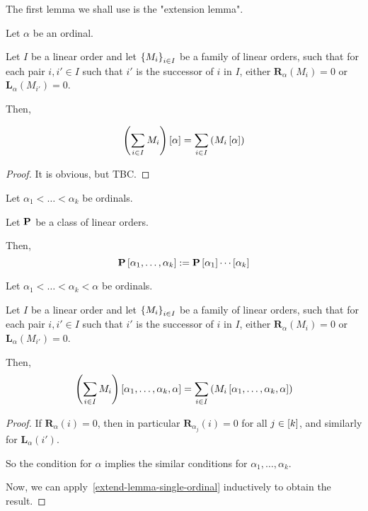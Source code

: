 The first lemma we shall use is the "extension lemma".

\begin{lemma}\label{extend-lemma-single-ordinal}
  Let $\alpha$ be an ordinal.

  Let $I$ be a linear order
  and let $\left\{ {M_i} \right\}_{i \in I}$ be a family of linear orders,
  such that for each pair $i, i' \in I$
  such that $i'$ is the successor of $i$ in $I$,
  either $\mathbf{R}_\alpha(M_{i}) = 0$ or $\mathbf{L}_\alpha(M_{i'}) = 0$.

  Then,

  \[
    \left( { \sum_{i \in I} M_i } \right) \left[ {\alpha} \right] = \sum_{i \in I} \left( { M_i \left[ {\alpha} \right] } \right)
  \]
\end{lemma}

\begin{proof}
  It is obvious, but TBC.
\end{proof}

\begin{notation}
  Let $\alpha_1 < \ldots < \alpha_k$ be ordinals.

  Let $\mathbf{P}$ be a class of linear orders.

  Then,
  \[
    \mathbf{P} \left[ {\alpha_1, \ldots, \alpha_k} \right] := \mathbf{P} \left[ {\alpha_1} \right] \cdots \left[ {\alpha_k} \right]
  \]
\end{notation}

\begin{corollary}\label{extend-lemma-multiple-ordinals}
  Let $\alpha_1 < \ldots < \alpha_k < \alpha$ be ordinals.

  Let $I$ be a linear order
  and let $\left\{ {M_i} \right\}_{i \in I}$ be a family of linear orders,
  such that for each pair $i, i' \in I$
  such that $i'$ is the successor of $i$ in $I$,
  either $\mathbf{R}_\alpha(M_{i}) = 0$ or $\mathbf{L}_\alpha(M_{i'}) = 0$.

  Then,
  \[
    \left( { \sum_{i \in I} M_i } \right) \left[ {\alpha_1, \ldots, \alpha_k, \alpha} \right]
    = \sum_{i \in I} \left( { M_i \left[ {\alpha_1, \ldots, \alpha_k, \alpha} \right] } \right)
  \]
\end{corollary}

\begin{proof}
  If $\mathbf{R}_\alpha(i) = 0$, then in particular
  $\mathbf{R}_{\alpha_j}(i) = 0$ for all $j \in \left[ {k} \right]$,
  and similarly for $\mathbf{L}_\alpha(i')$.

  So the condition for $\alpha$ implies
  the similar conditions for $\alpha_1, \ldots, \alpha_k$.

  Now, we can apply~\cref{extend-lemma-single-ordinal} inductively
  to obtain the result.
\end{proof}

